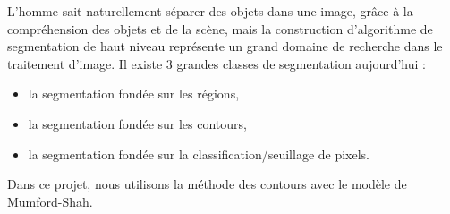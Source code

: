 \bigskip

L'homme sait naturellement séparer des objets dans une image, grâce à la compréhension des objets et de la scène,
mais la construction d'algorithme de segmentation de haut niveau représente un grand domaine de recherche dans le traitement d'image. 
Il existe 3 grandes classes de segmentation aujourd'hui :
\begin{itemize}
\item la segmentation fondée sur les régions,
\item la segmentation fondée sur les contours,
\item la segmentation fondée sur la classification/seuillage de pixels.
\end{itemize}

Dans ce projet, nous utilisons la méthode des contours avec le modèle de Mumford-Shah.

